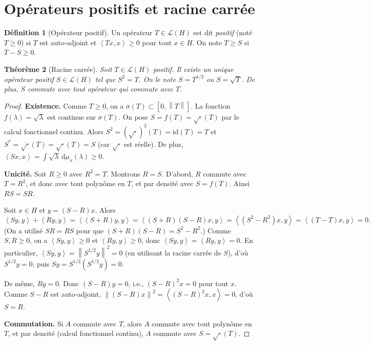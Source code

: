 \documentclass[a4paper,12pt]{book}
\newcommand{\dd}{\mathrm{d}}
\newcommand{\norm}[1]{\left\| #1 \right\|}
\newcommand{\inner}[2]{\left\langle #1, #2 \right\rangle}
\theoremstyle{definition}
\newtheorem{definition}{Définition}[chapter]
\theoremstyle{plain}
\newtheorem{theoreme}[definition]{Théorème}
\theoremstyle{remark}
\begin{document}
\section{Opérateurs positifs et racine carrée}

\begin{definition}[Opérateur positif]
\label{def:op-positif}
Un opérateur $T \in \mathcal{L}(H)$ est dit \emph{positif} (noté $T \ge 0$) si $T$ est
auto-adjoint et $\inner{Tx}{x} \ge 0$ pour tout $x \in H$. On note $T \ge S$ si
$T - S \ge 0$.
\end{definition}

\begin{theoreme}[Racine carrée]
\label{thm:racine-carree}
Soit $T \in \mathcal{L}(H)$ positif. Il existe un unique opérateur positif
$S \in \mathcal{L}(H)$ tel que $S^2 = T$. On le note $S = T^{1/2}$ ou $S = \sqrt{T}$.
De plus, $S$ commute avec tout opérateur qui commute avec $T$.
\end{theoreme}

\begin{proof}
\textbf{Existence.} Comme $T \ge 0$, on a $\sigma(T) \subset [0, \norm{T}]$. La fonction
$f(\lambda) = \sqrt{\lambda}$ est continue sur $\sigma(T)$. On pose $S = f(T) = \sqrt{\cdot}(T)$
par le calcul fonctionnel continu. Alors $S^2 = (\sqrt{\cdot})^2(T) = \mathrm{id}(T) = T$
et $S^* = \overline{\sqrt{\cdot}}(T) = \sqrt{\cdot}(T) = S$ (car $\sqrt{\cdot}$ est
réelle). De plus, $\inner{Sx}{x} = \int \sqrt{\lambda}\,\dd\mu_x(\lambda) \ge 0$.

\textbf{Unicité.} Soit $R \ge 0$ avec $R^2 = T$. Montrons $R = S$. D'abord, $R$ commute
avec $T = R^2$, et donc avec tout polynôme en $T$, et par densité avec $S = f(T)$. Ainsi
$RS = SR$.

Soit $x \in H$ et $y = (S - R)x$. Alors
\[
  \inner{Sy}{y} + \inner{Ry}{y}
    = \inner{(S+R)y}{y}
    = \inner{(S+R)(S-R)x}{y}
    = \inner{(S^2 - R^2)x}{y}
    = \inner{(T - T)x}{y} = 0.
\]
(On a utilisé $SR = RS$ pour que $(S+R)(S-R) = S^2 - R^2$.)
Comme $S, R \ge 0$, on a $\inner{Sy}{y} \ge 0$ et $\inner{Ry}{y} \ge 0$, donc
$\inner{Sy}{y} = \inner{Ry}{y} = 0$. En particulier,
$\inner{Sy}{y} = \norm{S^{1/2}y}^2 = 0$ (en utilisant la racine carrée de $S$), d'où
$S^{1/2}y = 0$, puis $Sy = S^{1/2}(S^{1/2}y) = 0$.

De même, $Ry = 0$. Donc $(S-R)y = 0$, i.e., $(S-R)^2 x = 0$ pour tout $x$. Comme
$S - R$ est auto-adjoint, $\norm{(S-R)x}^2 = \inner{(S-R)^2 x}{x} = 0$, d'où
$S = R$.

\textbf{Commutation.} Si $A$ commute avec $T$, alors $A$ commute avec tout polynôme en $T$,
et par densité (calcul fonctionnel continu), $A$ commute avec $S = \sqrt{\cdot}(T)$.
\end{proof}
\end{document}
